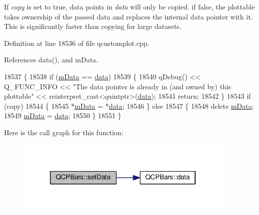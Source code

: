 If {\itshape copy} is set to true, data points in {\itshape data} will only be copied. if false, the plottable takes ownership of the passed data and replaces the internal data pointer with it. This is significantly faster than copying for large datasets. 

Definition at line 18536 of file qcustomplot.\+cpp.



References data(), and m\+Data.


\begin{DoxyCode}
18537 \{
18538   \textcolor{keywordflow}{if} (\hyperlink{class_q_c_p_bars_aef28d29d51ef84b608ecd22c55d531ff}{mData} == \hyperlink{class_q_c_p_bars_ac05c21de37f677545d06fd852ef8a743}{data})
18539   \{
18540     qDebug() << Q\_FUNC\_INFO << \textcolor{stringliteral}{"The data pointer is already in (and owned by) this plottable"} << \textcolor{keyword}{
      reinterpret\_cast<}quintptr\textcolor{keyword}{>}(\hyperlink{class_q_c_p_bars_ac05c21de37f677545d06fd852ef8a743}{data});
18541     \textcolor{keywordflow}{return};
18542   \}
18543   \textcolor{keywordflow}{if} (copy)
18544   \{
18545     *\hyperlink{class_q_c_p_bars_aef28d29d51ef84b608ecd22c55d531ff}{mData} = *\hyperlink{class_q_c_p_bars_ac05c21de37f677545d06fd852ef8a743}{data};
18546   \} \textcolor{keywordflow}{else}
18547   \{
18548     \textcolor{keyword}{delete} \hyperlink{class_q_c_p_bars_aef28d29d51ef84b608ecd22c55d531ff}{mData};
18549     \hyperlink{class_q_c_p_bars_aef28d29d51ef84b608ecd22c55d531ff}{mData} = \hyperlink{class_q_c_p_bars_ac05c21de37f677545d06fd852ef8a743}{data};
18550   \}
18551 \}
\end{DoxyCode}


Here is the call graph for this function\+:\nopagebreak
\begin{figure}[H]
\begin{center}
\leavevmode
\includegraphics[width=298pt]{class_q_c_p_bars_aa3435aab19e0a49e4e7b41bd36a8d96b_cgraph}
\end{center}
\end{figure}


\hypertarget{class_q_c_p_bars_a3efded5df4a82ecb201f7c28099fa2e5}{}
